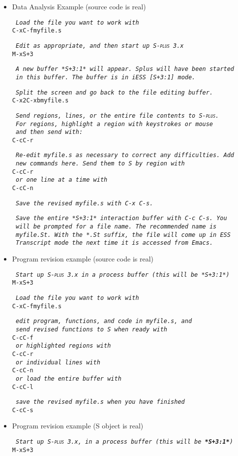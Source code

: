 \documentclass{article}
\newcommand*{\Splus}{\textsc{S-plus}}
\newcommand*{\Scmt}[1]{\hbox{\qquad {\footnotesize \#\#} \textsl{#1}}}
\newenvironment{Salltt}{\small\begin{alltt}}{\end{alltt}}
\begin{document}
\begin{itemize}
\item Data Analysis Example (source code is real)
\begin{Salltt}
  \Scmt{Load the file you want to work with}
  C-x C-f myfile.s

  \Scmt{Edit as appropriate, and then start up \Splus~3.x}
  M-x S+3

  \Scmt{A new buffer *S+3:1* will appear.  Splus will have been started}
  \Scmt{in this buffer.  The buffer is in iESS [S+3:1] mode.}

  \Scmt{Split the screen and go back to the file editing buffer.}
  C-x 2 C-x b myfile.s

  \Scmt{Send regions, lines, or the entire file contents to \Splus.}
  \Scmt{For regions, highlight a region with keystrokes or mouse}
  \Scmt{and then send with:}
  C-c C-r

  \Scmt{Re-edit myfile.s as necessary to correct any difficulties.  Add}
  \Scmt{new commands here.  Send them to S by region with}
  C-c C-r
  \Scmt{or one line at a time with}
  C-c C-n

  \Scmt{Save the revised myfile.s with C-x C-s.}

  \Scmt{Save the entire *S+3:1* interaction buffer with C-c C-s.  You}
  \Scmt{will be prompted for a file name.  The recommended name is}
  \Scmt{myfile.St.  With the *.St suffix, the file will come up in ESS}
  \Scmt{Transcript mode the next time it is accessed from Emacs.}
  \end{Salltt}

\item Program revision example (source code is real)
  \begin{Salltt}
  \Scmt{Start up \Splus~3.x in a process buffer (this will be *S+3:1*)}
  M-x S+3

  \Scmt{Load the file you want to work with}
  C-x C-f myfile.s
  
  \Scmt{edit program, functions, and code in myfile.s, and}
  \Scmt{send revised functions to S when ready with}
  C-c C-f
  \Scmt{or highlighted regions with}
  C-c C-r
  \Scmt{or individual lines with}
  C-c C-n
  \Scmt{or load the entire buffer with} 
  C-c C-l

  \Scmt{save the revised myfile.s when you have finished}
  C-c C-s
  \end{Salltt}

\item Program revision example (S object is real)
  \begin{Salltt}
  \Scmt{Start up \Splus~3.x, in a process buffer (this will be \textbf{*S+3:1*})} 
  M-x S+3


\end{Salltt}
\end{itemize}
\end{document}
